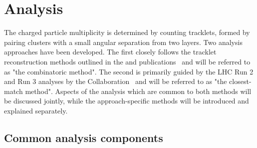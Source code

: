 \section{Analysis}
\label{sec:analysis}
The charged particle multiplicity is determined by counting tracklets, formed by pairing clusters with a small angular separation from two \intt layers. 
Two analysis approaches have been developed. The first closely follows the tracklet reconstruction methods outlined in the \phobos and \phenix  publications~\cite{PHOBOS:2010eyu,PHENIX:2000owy} and will be referred to as "the combinatoric method". The second is primarily guided by the LHC Run 2 \xexe and Run 3 \pbpb analyses by the \cms Collaboration~\cite{CMS:2019gzk, CMS:2024ykx} and will be referred to as "the closest-match method". Aspects of the analysis which are common to both methods will be discussed jointly, while the approach-specific methods will be introduced and explained separately.

\subsection{Common analysis components}


